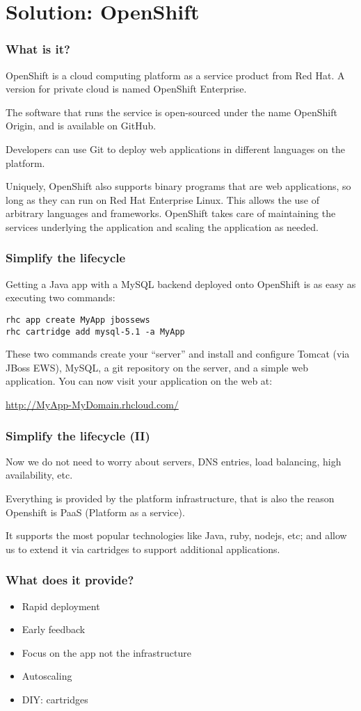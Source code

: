 \documentclass[bigger]{beamer}
\begin{document}
\section{Solution: OpenShift}
\label{sec-2}
\begin{frame}
\frametitle{What is it?}
\label{sec-2-1}


OpenShift is a cloud computing platform as a service product from Red Hat. A version for private cloud is named OpenShift Enterprise.

The software that runs the service is open-sourced under the name
OpenShift Origin, and is available on GitHub. 

Developers can use Git to deploy web applications in different languages on the platform.

Uniquely, OpenShift also supports binary programs that are web
applications, so long as they can run on Red Hat Enterprise Linux. 
This allows the use of arbitrary languages and frameworks. OpenShift takes care of maintaining the services underlying the application and scaling the application as needed.
\end{frame}
\begin{frame}[fragile]
\frametitle{Simplify the lifecycle}
\label{sec-2-2}


Getting a Java app with a MySQL backend deployed onto OpenShift is as
easy as executing two commands:


\begin{verbatim}
rhc app create MyApp jbossews
rhc cartridge add mysql-5.1 -a MyApp
\end{verbatim}

These two commands create your ``server'' and install and configure Tomcat (via JBoss EWS), MySQL, a git repository on the server, and a simple web application. You can now visit your application on the web at:

\href{http://MyApp-MyDomain.rhcloud.com/}{http://MyApp-MyDomain.rhcloud.com/}
\end{frame}
\begin{frame}
\frametitle{Simplify the lifecycle (II)}
\label{sec-2-3}


Now we do not need to worry about servers, DNS entries, load
balancing, high availability, etc.

Everything is provided by the platform infrastructure, that is also
the reason Openshift is PaaS (Platform as a service).

It supports the most popular technologies like Java, ruby, nodejs,
etc; and allow us to extend it via cartridges to support additional applications.
\end{frame}
\begin{frame}
\frametitle{What does it provide?}
\label{sec-2-4}

 
\begin{itemize}
\item Rapid deployment
\item Early feedback
\item Focus on the app not the infrastructure
\item Autoscaling
\item DIY: cartridges
\end{itemize}
\end{frame}
\end{document}
